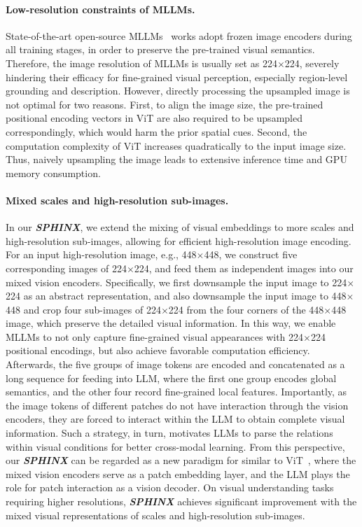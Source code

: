 \documentclass{article} \usepackage{iclr2024_conference,times}
\begin{document}
\paragraph{Low-resolution constraints of MLLMs.}
State-of-the-art open-source MLLMs~\citep{li2023blip,llava,gao2023llama,chen2023shikra,peng2023kosmos,chen2023minigpt} works adopt frozen image encoders during all training stages, in order to preserve the pre-trained visual semantics. Therefore, the image resolution of MLLMs is usually set as 224$\times$224, severely hindering their efficacy for fine-grained visual perception, especially region-level grounding and description. However, directly processing the upsampled image is not optimal for two reasons. First, to align the image size, the pre-trained positional encoding vectors in ViT are also required to be upsampled correspondingly, which would harm the prior spatial cues. Second, the computation complexity of ViT increases quadratically to the input image size. Thus, naively upsampling the image leads to extensive inference time and GPU memory consumption.

\paragraph{Mixed scales and high-resolution sub-images.}
In our \textcolor{Goldenrod3}{\textbf{\textit{SPHINX}}}, we extend the mixing of visual embeddings to more scales and high-resolution sub-images, allowing for efficient high-resolution image encoding. For an input high-resolution image, e.g., 448$\times$448, we construct five corresponding images of 224$\times$224, and feed them as independent images into our mixed vision encoders. Specifically, we first downsample the input image to 224$\times$224 as an abstract representation, and also downsample the input image to 448$\times$448 and crop four sub-images of 224$\times$224 from the four corners of the 448$\times$448 image, which preserve the detailed visual information. In this way, we enable MLLMs to not only capture fine-grained visual appearances with 224$\times$224 positional encodings, but also achieve favorable computation efficiency. Afterwards, the five groups of image tokens are encoded and concatenated as a long sequence for feeding into LLM, where the first one group encodes global semantics, and the other four record fine-grained local features. 
Importantly, as the image tokens of different patches do not have interaction through the vision encoders, they are forced
to interact within the LLM to obtain complete visual information.
Such a strategy, in turn, motivates LLMs to parse
the relations within visual conditions for better cross-modal learning.
From this perspective, our \textcolor{Goldenrod3}{\textbf{\textit{SPHINX}}} can be regarded as a new paradigm for similar to ViT~\citep{dosovitskiy2020image}, where the mixed vision encoders serve as a patch embedding layer, and the LLM plays the role for patch interaction as a vision decoder.
On visual understanding tasks requiring higher resolutions, \textcolor{Goldenrod3}{\textbf{\textit{SPHINX}}} achieves significant improvement with the mixed visual representations of scales and high-resolution sub-images.
\end{document}
